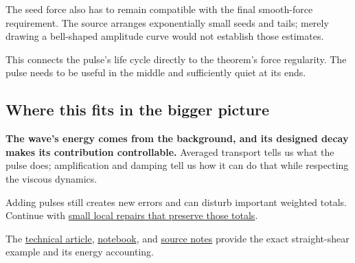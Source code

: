 \documentclass[
  english,
  11pt,
]{article}
\begin{document}
The seed force also has to remain compatible with the final smooth-force
requirement. The source arranges exponentially small seeds and tails;
merely drawing a bell-shaped amplitude curve would not establish those
estimates.

This connects the pulse's life cycle directly to the theorem's force
regularity. The pulse needs to be useful in the middle and sufficiently
quiet at its ends.

\subsection{Where this fits in the bigger
picture}\label{where-this-fits-in-the-bigger-picture}

\textbf{The wave's energy comes from the background, and its designed
decay makes its contribution controllable.} Averaged transport tells us
what the pulse does; amplification and damping tell us how it can do
that while respecting the viscous dynamics.

Adding pulses still creates new errors and can disturb important
weighted totals. Continue with
\href{../d6_moment_correction/article.html}{small local repairs that
preserve those totals}.

The \href{technical-article.html}{technical article},
\href{../../code/d5_shearing_wave/study.ipynb}{notebook}, and
\href{source-notes.md}{source notes} provide the exact straight-shear
example and its energy accounting.
\end{document}
